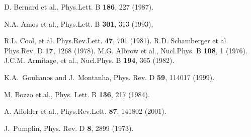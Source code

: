 \documentclass[12pt]{article}
\begin{document}
\begin{thebibliography}{9}
D. Bernard et al., Phys.Lett. B {\bf186}, 227 (1987).

N.A. Amos et al., Phys.Lett. B {\bf301}, 313 (1993).


 R.L. Cool, et al. Phys.Rev.Lett. {\bf47}, 701 (1981).
 R.D. Schamberger et al. Phys.Rev. D {\bf17}, 1268 (1978).
 M.G. Albrow et al., Nucl.Phys. B {\bf108}, 1 (1976).
 J.C.M. Armitage, et al., Nucl.Phys. B {\bf194}, 365 (1982).
   
 K.A.~Goulianos and J.~Montanha,  Phys. Rev. D {\bf 59}, 114017 (1999).%
  
 M. Bozzo et.al., Phys. Lett. B {\bf136}, 217 (1984).
  
 A. Affolder et al., Phys.Rev.Lett. {\bf87}, 141802 (2001).
 
 J.~Pumplin, Phys. Rev. D {\bf8}, 2899 (1973).
\end{thebibliography}
\end{document}
